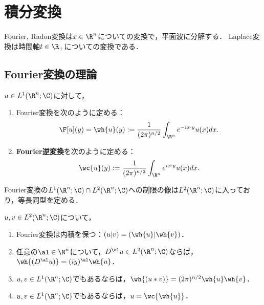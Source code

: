 \documentclass[uplatex,dvipdfmx]{jsreport}
\begin{document}
\section{積分変換}

\begin{tcolorbox}[colframe=ForestGreen, colback=ForestGreen!10!white,breakable,colbacktitle=ForestGreen!40!white,coltitle=black,fonttitle=\bfseries\sffamily,
title=]
    Fourier, Radon変換は$x\in\R^n$についての変換で，平面波に分解する．
    Laplace変換は時間軸$t\in\R_+$についての変換である．
\end{tcolorbox}

\subsection{Fourier変換の理論}

\begin{definition}
    $u\in L^1(\R^n;\C)$に対して，
    \begin{enumerate}
        \item Fourier変換を次のように定める：
        \[\F[u](y)=\wh{u}(y):=\frac{1}{(2\pi)^{n/2}}\int_{\R^n}e^{-ix\cdot y}u(x)dx.\]
        \item \textbf{Fourier逆変換}を次のように定める：
        \[\wc{u}(y):=\frac{1}{(2\pi)^{n/2}}\int_{\R^n}e^{ix\cdot y}u(x)dx.\]
    \end{enumerate}
\end{definition}

\begin{theorem}[Plancherel]
    Fourier変換の$L^1(\R^n;\C)\cap L^2(\R^n;\C)$への制限の像は$L^2(\R^n;\C)$に入っており，等長同型を定める．
\end{theorem}

\begin{proposition}\label{prop-inversion-formula-for-Fourier-transform}
    $u,v\in L^2(\R^n;\C)$について，
    \begin{enumerate}
        \item Fourier変換は内積を保つ：$(u|v)=(\wh{u}|\wh{v})$．
        \item 任意の$\al\in\N^n$について，$D^\al u\in L^2(\R^n;\C)$ならば，$\wh{(D^\al u)}=(iy)^\al\wh{u}$．
        \item $u,v\in L^1(\R^n;\C)$でもあるならば，$\wh{(u*v)}=(2\pi)^{n/2}\wh{u}\wh{v}$．
        \item $u,v\in L^1(\R^n;\C)$でもあるならば，$u=\wc{\wh{u}}$．
    \end{enumerate}
\end{proposition}
\end{document}
